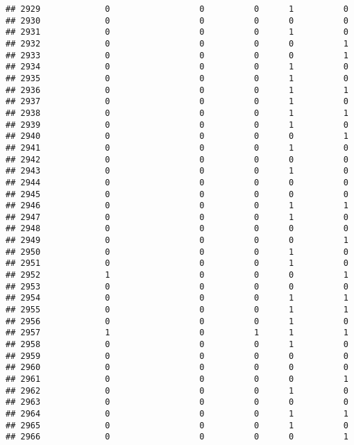 \documentclass[
]{article}
\begin{document}
\begin{verbatim}
## 2929             0                  0          0      1          0
## 2930             0                  0          0      0          0
## 2931             0                  0          0      1          0
## 2932             0                  0          0      0          1
## 2933             0                  0          0      0          1
## 2934             0                  0          0      1          0
## 2935             0                  0          0      1          0
## 2936             0                  0          0      1          1
## 2937             0                  0          0      1          0
## 2938             0                  0          0      1          1
## 2939             0                  0          0      1          0
## 2940             0                  0          0      0          1
## 2941             0                  0          0      1          0
## 2942             0                  0          0      0          0
## 2943             0                  0          0      1          0
## 2944             0                  0          0      0          0
## 2945             0                  0          0      0          0
## 2946             0                  0          0      1          1
## 2947             0                  0          0      1          0
## 2948             0                  0          0      0          0
## 2949             0                  0          0      0          1
## 2950             0                  0          0      1          0
## 2951             0                  0          0      1          0
## 2952             1                  0          0      0          1
## 2953             0                  0          0      0          0
## 2954             0                  0          0      1          1
## 2955             0                  0          0      1          1
## 2956             0                  0          0      1          0
## 2957             1                  0          1      1          1
## 2958             0                  0          0      1          0
## 2959             0                  0          0      0          0
## 2960             0                  0          0      0          0
## 2961             0                  0          0      0          1
## 2962             0                  0          0      1          0
## 2963             0                  0          0      0          0
## 2964             0                  0          0      1          1
## 2965             0                  0          0      1          0
## 2966             0                  0          0      0          1

\end{verbatim}
\end{document}
